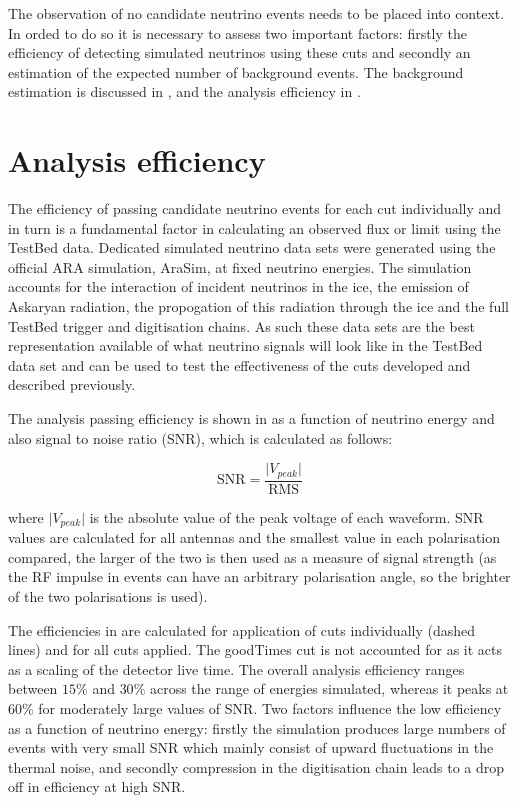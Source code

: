The observation of no candidate neutrino events needs to be placed into context. In orded to do so it is necessary to assess two important factors: firstly the efficiency of detecting simulated neutrinos using these cuts and secondly an estimation of the expected number of background events. The background estimation is discussed in , and the analysis efficiency in .


\section{Analysis efficiency}
\label{sec:Analysis:Efficiency}

The efficiency of passing candidate neutrino events for each cut individually and in turn is a fundamental factor in calculating an observed flux or limit using the TestBed data. Dedicated simulated neutrino data sets were generated using the official ARA simulation, AraSim, at fixed neutrino energies. The simulation accounts for the interaction of incident neutrinos in the ice, the emission of Askaryan radiation, the propogation of this radiation through the ice and the full TestBed trigger and digitisation chains. As such these data sets are the best representation available of what neutrino signals will look like in the TestBed data set and can be used to test the effectiveness of the cuts developed and described previously.

The analysis passing efficiency is shown in  as a function of neutrino energy and also signal to noise ratio (SNR), which is calculated as follows:

\begin{equation}
  \mbox{SNR} = \frac{\lvert V_{peak} \rvert}{\mbox{RMS}}
\end{equation}

\noindent where $\lvert V_{peak} \rvert$ is the absolute value of the peak voltage of each waveform. SNR values are calculated for all antennas and the smallest value in each polarisation compared, the larger of the two is then used as a measure of signal strength (as the RF impulse in events can have an arbitrary polarisation angle, so the brighter of the two polarisations is used).

The efficiencies in  are calculated for application of cuts individually (dashed lines) and for all cuts applied. The goodTimes cut is not accounted for as it acts as a scaling of the detector live time. The overall analysis efficiency ranges between $15 \%$ and $30 \%$ across the range of energies simulated, whereas it peaks at $60 \%$ for moderately large values of SNR. Two factors influence the low efficiency as a function of neutrino energy: firstly the simulation produces large numbers of events with very small SNR which mainly consist of upward fluctuations in the thermal noise, and secondly compression in the digitisation chain leads to a drop off in efficiency at high SNR. 

